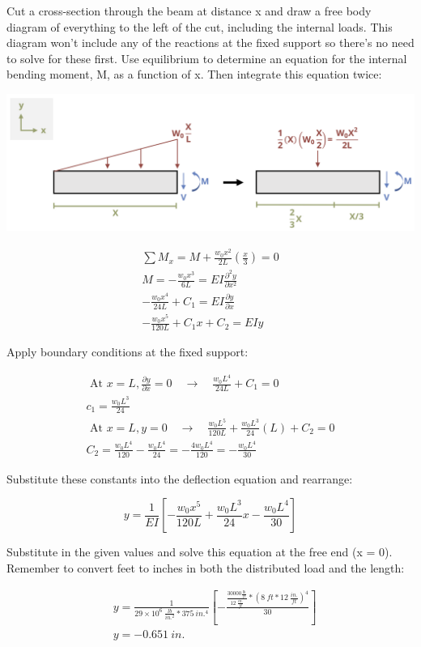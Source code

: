 \documentclass[
  letterpaper,
  DIV=11,
  numbers=noendperiod]{scrreprt}
\theoremstyle{definition}
\theoremstyle{remark}
\begin{document}
\begin{tcolorbox}
\begin{tcolorbox}
Cut a cross-section through the beam at distance x and draw a free body
diagram of everything to the left of the cut, including the internal
loads. This diagram won't include any of the reactions at the fixed
support so there's no need to solve for these first. Use equilibrium to
determine an equation for the internal bending moment, M, as a function
of x. Then integrate this equation twice:

\begin{center}
\includegraphics{images/CH11 PNGs/example11.2-2.png}
\end{center}

\[
\begin{gathered} \sum M_x=M+\frac{w_0 x^2}{2 L}\left(\frac{x}{3}\right)=0 \\ M=-\frac{w_0 x^3}{6 L}=E I \frac{\partial^2 y}{\partial x^2} \\ -\frac{w_0 x^4}{24 L}+C_1=E I \frac{\partial y}{\partial x} \\ -\frac{w_0 x^5}{120 L}+C_1 x+C_2=EIy\end{gathered}
\]

Apply boundary conditions at the fixed support:

\[
\begin{gathered} \text { At } x=L, \frac{\partial y}{\partial x}=0 \quad \rightarrow \quad \frac{w_0 L^4}{24 L}+C_1=0
\\ c_1=\frac{w_0 L^3}{24}
\\ \text { At } x=L, y=0 \quad \rightarrow \quad \frac{w_0 L^5}{120 L}+\frac{w_0 L^3}{24}(L)+C_2=0
\\ C_2=\frac{w_0 L^4}{120}-\frac{w_0 L^4}{24}=-\frac{4 w_0 L^4}{120}=-\frac{w_0 L^4}{30} \end{gathered}
\]

Substitute these constants into the deflection equation and rearrange:

\[
y=\frac{1}{E I}\left[-\frac{w_0 x^5}{120L}+\frac{w_0 L^3}{24} x-\frac{w_0 L^4}{30}\right]
\]

Substitute in the given values and solve this equation at the free end
(x = 0). Remember to convert feet to inches in both the distributed load
and the length:

\[
\begin{aligned}
& y=\frac{1}{29 \times 10^6~\frac{lb}{in.^2}*375{~in.^4}} \left[-\frac{\frac{30000\frac{lb}{ft}}{12~\frac{in.}{ft}}*(8{~ft}*12~\frac{in.}{ft})^4}{30}\right] \\
& y=- 0.651{~in.}\end{aligned}
\]

\end{tcolorbox}

\end{tcolorbox}
\end{document}
